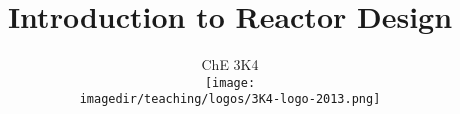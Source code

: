 \documentclass[14pt]{beamer}
\title[]{\large Introduction to Reactor Design}
\subtitle[]{\large ChE 3K4\\\vspace{0.5cm}\texttt{[image: \\imagedir/teaching/logos/3K4-logo-2013.png]}\vspace{-1.5cm} }
\author[]{}
\institute[]{}
\date[]{Kevin Dunn, \today \\ \vspace{1cm} {\footnotesize {\tt kevin.dunn@mcmaster.ca}\\
\href{http://learnche.mcmaster.ca/3K4}{http://learnche.mcmaster.ca/3K4}\\} \vspace{1cm}

{\footnotesize Overall revision number: \hgversion (\monthname~\THEYEAR)} %
}
\begin{document}
	
\begin{frame} \titlepage \end{frame}


\end{document}
